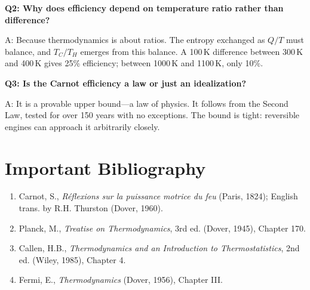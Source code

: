 \textbf{Q2: Why does efficiency depend on temperature ratio rather than difference?}

A: Because thermodynamics is about ratios. The entropy exchanged as $Q/T$ must balance, and $T_C/T_H$ emerges from this balance. A 100\,K difference between 300\,K and 400\,K gives 25\% efficiency; between 1000\,K and 1100\,K, only 10\%.

\textbf{Q3: Is the Carnot efficiency a law or just an idealization?}

A: It is a provable upper bound---a law of physics. It follows from the Second Law, tested for over 150 years with no exceptions. The bound is tight: reversible engines can approach it arbitrarily closely.
\section*{Important Bibliography}

\begin{enumerate}
\item Carnot, S., \textit{R\'eflexions sur la puissance motrice du feu} (Paris, 1824); English trans. by R.H. Thurston (Dover, 1960).
\item Planck, M., \textit{Treatise on Thermodynamics}, 3rd ed. (Dover, 1945), Chapter 170.
\item Callen, H.B., \textit{Thermodynamics and an Introduction to Thermostatistics}, 2nd ed. (Wiley, 1985), Chapter 4.
\item Fermi, E., \textit{Thermodynamics} (Dover, 1956), Chapter III.
\end{enumerate}

